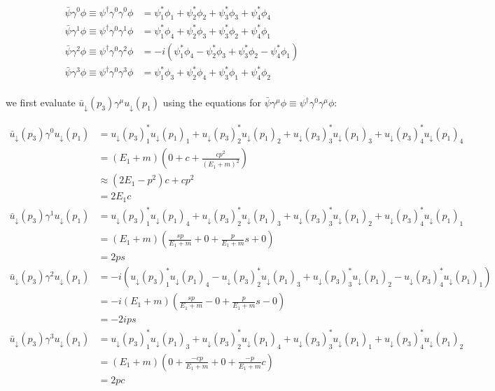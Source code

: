 \documentclass[11pt]{article}
\theoremstyle{definition}
\begin{document}
\begin{align}
    \bar{\psi}\gamma^{0}\phi \equiv \psi^{\dagger}\gamma^{0}\gamma^{0}\phi &=
    \psi_1^*\phi_1 + \psi_2^*\phi_2 + \psi_3^*\phi_3 + \psi_4^*\phi_4\\
    \bar{\psi}\gamma^{1}\phi \equiv \psi^{\dagger}\gamma^{0}\gamma^{1}\phi &=
    \psi_1^*\phi_4 + \psi_2^*\phi_3 + \psi_3^*\phi_2 + \psi_4^*\phi_1\\
    \bar{\psi}\gamma^{2}\phi \equiv \psi^{\dagger}\gamma^{0}\gamma^{2}\phi &=
    -i(\psi_1^*\phi_4 - \psi_2^*\phi_3 + \psi_3^*\phi_2 - \psi_4^*\phi_1)\\
    \bar{\psi}\gamma^{3}\phi \equiv \psi^{\dagger}\gamma^{0}\gamma^{3}\phi &=
    \psi_1^*\phi_3 + \psi_2^*\phi_4 + \psi_3^*\phi_1 + \psi_4^*\phi_2\\
\end{align}

we first evaluate $\bar{u}_{\downarrow}(p_3)\gamma^{\mu}u_{\downarrow}(p_1)$ using the equations for $\bar{\psi}\gamma^{\mu}\phi \equiv \psi^{\dagger}\gamma^{0}\gamma^{\mu}\phi$:

\begin{align}
    \bar{u}_{\downarrow}(p_3)\gamma^{0}u_{\downarrow}(p_1)
    &=
    u_{\downarrow}(p_3)_1^*u_{\downarrow}(p_1)_1 + u_{\downarrow}(p_3)_2^*u_{\downarrow}(p_1)_2 + u_{\downarrow}(p_3)_3^*u_{\downarrow}(p_1)_3 + u_{\downarrow}(p_3)_4^*u_{\downarrow}(p_1)_4\\
    &= (E_1+m)\left(0 + c + \frac{cp^2}{(E_1+m)^2}\right)\\
    &\approx (2E_1-p^2)c + cp^2\\
    &= 2E_1c\\
    \bar{u}_{\downarrow}(p_3)\gamma^{1}u_{\downarrow}(p_1)
    &=
    u_{\downarrow}(p_3)_1^*u_{\downarrow}(p_1)_4 + u_{\downarrow}(p_3)_2^*u_{\downarrow}(p_1)_3 + u_{\downarrow}(p_3)_3^*u_{\downarrow}(p_1)_2 + u_{\downarrow}(p_3)_4^*u_{\downarrow}(p_1)_1\\
    &= (E_1+m) \left( \frac{sp}{E_1+m} + 0 + \frac{p}{E_1+m}s + 0 \right)\\
    &= 2ps\\
    \bar{u}_{\downarrow}(p_3)\gamma^{2}u_{\downarrow}(p_1)
    &=
    -i(u_{\downarrow}(p_3)_1^*u_{\downarrow}(p_1)_4 - u_{\downarrow}(p_3)_2^*u_{\downarrow}(p_1)_3 + u_{\downarrow}(p_3)_3^*u_{\downarrow}(p_1)_2 - u_{\downarrow}(p_3)_4^*u_{\downarrow}(p_1)_1)\\
    &= -i(E_1+m)\left( \frac{sp}{E_1+m} - 0 + \frac{p}{E_1+m}s - 0 \right)\\
    &= -2ips\\
    \bar{u}_{\downarrow}(p_3)\gamma^{3}u_{\downarrow}(p_1)
    &=
    u_{\downarrow}(p_3)_1^*u_{\downarrow}(p_1)_3 + u_{\downarrow}(p_3)_2^*u_{\downarrow}(p_1)_4 + u_{\downarrow}(p_3)_3^*u_{\downarrow}(p_1)_1 + u_{\downarrow}(p_3)_4^*u_{\downarrow}(p_1)_2\\
    &=(E_1+m) \left( 0 + \frac{-cp}{E_1+m} + 0 + \frac{-p}{E_1+m}c \right)\\
    &= 2pc
\end{align}
\end{document}
